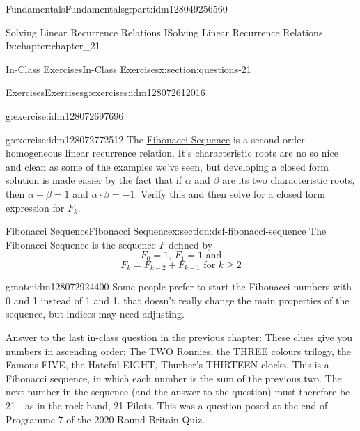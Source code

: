 \documentclass[oneside,10pt,]{book}
\numberwithin{equation}{section}
\begin{document}
\begin{partptx}{Fundamentals}{}{Fundamentals}{}{}{g:part:idm128049256560}
\begin{chapterptx}{Solving Linear Recurrence Relations I}{}{Solving Linear Recurrence Relations I}{}{}{x:chapter:chapter_21}
\begin{sectionptx}{In-Class Exercises}{}{In-Class Exercises}{}{}{x:section:questions-21}
\begin{exercises-subsection}{Exercises}{}{Exercises}{}{}{g:exercises:idm128072612016}
\begin{exercisegroup}
\begin{divisionexerciseeg}{3}{}{}{g:exercise:idm128072697696}
\end{divisionexerciseeg}%
\begin{divisionexerciseeg}{4}{}{}{g:exercise:idm128072772512}%
The \hyperref[x:section:def-fibonacci-sequence]{Fibonacci Sequence}  is a second order homogeneous linear recurrence relation. It's characteristic roots are no so nice and clean as some of the examples we've seen, but developing a closed form solution is made easier by the fact that if \(\alpha\) and \(\beta\) are its two characteristic roots, then \(\alpha + \beta = 1\) and \(\alpha \cdot \beta =-1\).  Verify this and then solve for a closed form expression for \(F_k\).%
\end{divisionexerciseeg}%
\end{exercisegroup}
\par\medskip\noindent
\end{exercises-subsection}
\end{sectionptx}
%
%
\typeout{************************************************}
\typeout{************************************************}
%
\begin{sectionptx}{Fibonacci Sequence}{}{Fibonacci Sequence}{}{}{x:section:def-fibonacci-sequence}
%
The Fibonacci Sequence is the sequence \(F\) defined by%
\begin{equation*}
F_0= 1 \textrm{, } F_1= 1\textrm{ and}
\end{equation*}
%
\begin{equation*}
F_k = F_{k-2} + F_{k-1} \textrm{ for }k\geq 2
\end{equation*}
%
\begin{note}{}{g:note:idm128072924400}%
Some people prefer to start the Fibonacci numbers with 0 and 1 instead of 1 and 1.  that doesn't really change the main properties of the sequence, but indices may need adjusting.%
\end{note}
Answer to the last in-class question in the previous chapter: These clues give you numbers in ascending order: The TWO Ronnies, the THREE colours trilogy, the Famous FIVE, the Hateful EIGHT, Thurber's THIRTEEN clocks. This is a Fibonacci sequence, in which each number is the sum of the previous two. The next number in the sequence (and the answer to the question) must therefore be 21 - as in the rock band, 21 Pilots. This was a question posed at the end of Programme 7 of the 2020 Round Britain Quiz.%
\end{sectionptx}
\end{chapterptx}

\end{partptx}
\end{document}
